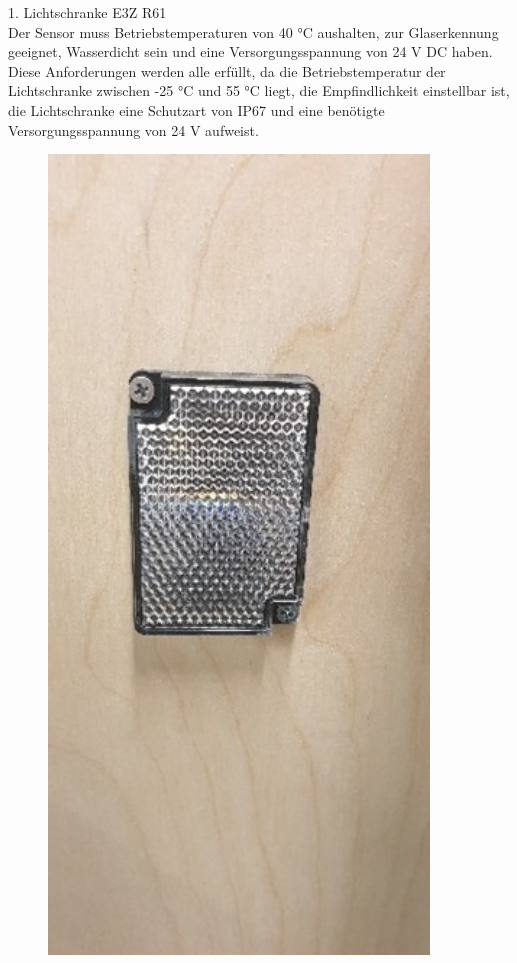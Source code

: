 \documentclass[10pt,a4paper]{report}
\begin{document}
	1. Lichtschranke E3Z R61 \\
	Der Sensor muss Betriebstemperaturen von 40 °C aushalten, zur Glaserkennung geeignet, Wasserdicht sein und eine
	Versorgungsspannung von 24 V DC haben. Diese Anforderungen werden alle erfüllt, da die Betriebstemperatur der Lichtschranke zwischen -25 °C und 55 °C liegt, die Empfindlichkeit einstellbar ist, die Lichtschranke eine Schutzart von IP67 und eine benötigte Versorgungsspannung von 24 V aufweist.\\
	
	\begin{figure}
		\begin{minipage}[b]{.4\linewidth}
			\includegraphics[width=0.9\textwidth]{Lichtschranke 1}

\end{minipage}
\end{figure}
\end{document}
